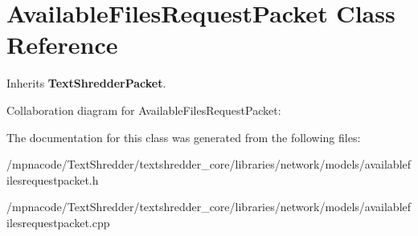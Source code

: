 \section{AvailableFilesRequestPacket Class Reference}
\label{class_available_files_request_packet}


Inherits {\bf TextShredderPacket}.



Collaboration diagram for AvailableFilesRequestPacket:


The documentation for this class was generated from the following files:\begin{DoxyCompactItemize}
\item 
/mpnacode/TextShredder/textshredder\_\-core/libraries/network/models/availablefilesrequestpacket.h\item 
/mpnacode/TextShredder/textshredder\_\-core/libraries/network/models/availablefilesrequestpacket.cpp\end{DoxyCompactItemize}
